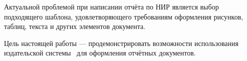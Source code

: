 
Актуальной проблемой при написании отчёта по НИР является выбор подходящего шаблона, удовлетворяющего требованиям оформления рисунков, таблиц, текста и других элементов документа.

Цель настоящей работы --- продемонстрировать возможности использования издательской системы \LaTeXe\ для оформления отчётных документов.
